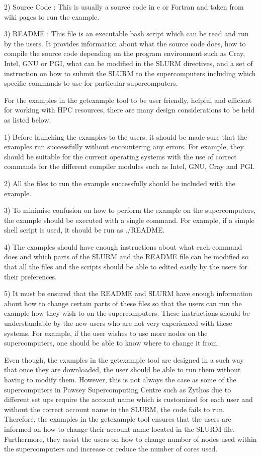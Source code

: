 \begin{Document}
{2) Source Code : This is usually a source code in c or Fortran and taken from wiki pages to run the example.

3) README : This file is an executable bash script which can be read and run by the users. It provides information about what the source code does,
how to compile the source code depending on the program environment such as Cray, Intel, GNU or PGI, what can be modified in the SLURM directives, and 
a set of instruction on how to submit the SLURM to the supercomputers including which specific commands to use for particular supercomputers.

For the examples in the getexample tool to be user friendly, helpful and efficient for working with HPC resources, there are many design considerations 
to be held as listed below:

1) Before launching the examples to the users, it should be made sure that the examples run successfully without encountering any errors. For example,
they should be suitable for the current operating systems with the use of correct commands for the different compiler modules such as Intel, GNU, Cray
and PGI. 

2) All the files to run the example successfully should be included with the example.

3) To minimise confusion on how to perform the example on the supercomputers, the example should be executed with a single command. For example, 
if a simple shell script is used, it should be run as ./README.

4) The examples should have enough instructions about what each command does and which parts of the SLURM and the README file can be modified so that
all the files and the scripts should be able to edited easily by the users for their preferences.

5) It must be ensured that the README and SLURM have enough information about how to change certain parts of these files so that the users can run the 
example how they wish to on the supercomputers. These instructions should be understandable by the new users who are not very experienced with these
systems. For example, if the user wishes to use more nodes on the supercomputers, one should be able to know where to change it from.
 
Even though, the examples in the getexample tool are designed in a such way that once they are downloaded, the user should be able to run them without
having to modify them. However, this is not always the case as some of the supercomputers in Pawsey Supercomputing Centre such as Zythos due to
different set ups require the account name which is customized for each user and without the correct account name in the SLURM, the code fails to run. 
Therefore, the examples in the getexample tool ensures that the users are informed on how to change their account name located in the SLURM file.
Furthermore, they assist the users on how to change number of nodes used within the supercomputers and increase or reduce the number of cores used.     


}
\end{Document}
